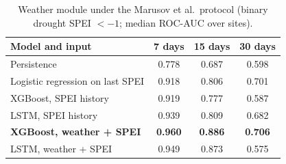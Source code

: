 \begin{table}[H]
\centering
\caption{Weather module under the Marusov et al.\ protocol (binary drought SPEI $< -1$; median ROC-AUC over sites).}
\label{tab:w_marusov}
\footnotesize
\begin{tabular}{@{}lccc@{}}
\toprule
\textbf{Model and input} & \textbf{7 days} & \textbf{15 days} & \textbf{30 days} \\
\midrule
Persistence & 0.778 & 0.687 & 0.598 \\
Logistic regression on last SPEI & 0.918 & 0.806 & 0.701 \\
XGBoost, SPEI history & 0.919 & 0.777 & 0.587 \\
LSTM, SPEI history & 0.939 & 0.809 & 0.682 \\
\textbf{XGBoost, weather + SPEI} & \textbf{0.960} & \textbf{0.886} & \textbf{0.706} \\
LSTM, weather + SPEI & 0.949 & 0.873 & 0.575 \\
\bottomrule
\end{tabular}
\end{table}
